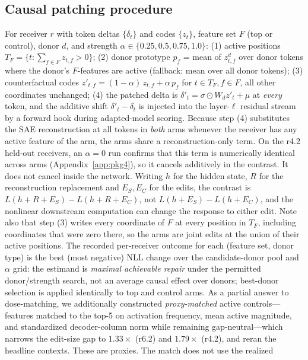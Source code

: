 \documentclass[10pt]{article} %
\newcommand{\rsix}{r6.2}
\newcommand{\rfour}{r4.2}
\begin{document}
\subsection{Causal patching procedure}
For receiver $r$ with token deltas $\{\delta_t\}$ and codes
$\{z_t\}$, feature set $F$ (top or control), donor $d$, and strength
$\alpha \in \{0.25,0.5,0.75,1.0\}$:
(1) active positions $T_F = \{t : \sum_{f\in F} z_{t,f} > 0\}$;
(2) donor prototype $p_f$ = mean of $z^{d}_{t,f}$ over donor tokens where the
donor's $F$-features are active (fallback: mean over all donor tokens);
(3) counterfactual codes $z'_{t,f} = (1-\alpha)\,z_{t,f} + \alpha\,p_f$ for
$t \in T_F, f \in F$, all other coordinates unchanged;
(4) the patched delta is $\delta'_t = \sigma \odot W_d z'_t + \mu$ at
\emph{every} token, and the additive shift $\delta'_t - \delta_t$ is injected
into the layer-$\ell$ residual stream by a forward hook during adapted-model
scoring. Because step (4) substitutes the SAE reconstruction at all tokens in
\emph{both} arms whenever the receiver has any active feature of the arm,
the arms share a reconstruction-only term. On the \rfour{} held-out receivers,
an $\alpha{=}0$ run confirms that this term is numerically identical across
arms (Appendix~\ref{app:pkg4}), so it cancels additively in the contrast.
It does not cancel inside the network. Writing $h$ for the hidden state, $R$
for the reconstruction replacement and $E_S, E_C$ for the edits, the contrast
is $L(h{+}R{+}E_S) - L(h{+}R{+}E_C)$, not $L(h{+}E_S) - L(h{+}E_C)$, and
the nonlinear downstream computation can change the response to either edit.
Note also that step (3) writes every coordinate of $F$ at every position in
$T_F$, including coordinates that were zero there, so the arms are joint
edits at the union of their active positions. The recorded per-receiver outcome for each (feature set, donor
type) is the best (most negative) NLL change over the candidate-donor pool
and $\alpha$ grid: the estimand is \emph{maximal achievable repair} under
the permitted donor/strength search, not an average causal effect over
donors; best-donor selection is applied identically to top and control
arms. As a partial answer to dose-matching, we additionally constructed
\emph{proxy-matched} active controls---features matched to the top-5 on
activation frequency, mean active magnitude, and standardized decoder-column
norm while remaining gap-neutral---which narrows the edit-size gap to
$1.33\times$ (\rsix{}) and $1.79\times$ (\rfour{}), and reran the headline
contexts. These are proxies. The match does not use the realized
\end{document}
